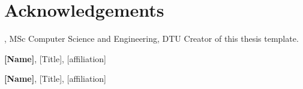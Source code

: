 \section*{Acknowledgements}
\textbf{\thesisauthor}, MSc Computer Science and Engineering, DTU \newline
Creator of this thesis template.

\textbf{[Name]}, [Title], [affiliation] \newline
[text]

\textbf{[Name]}, [Title], [affiliation] \newline
[text]
